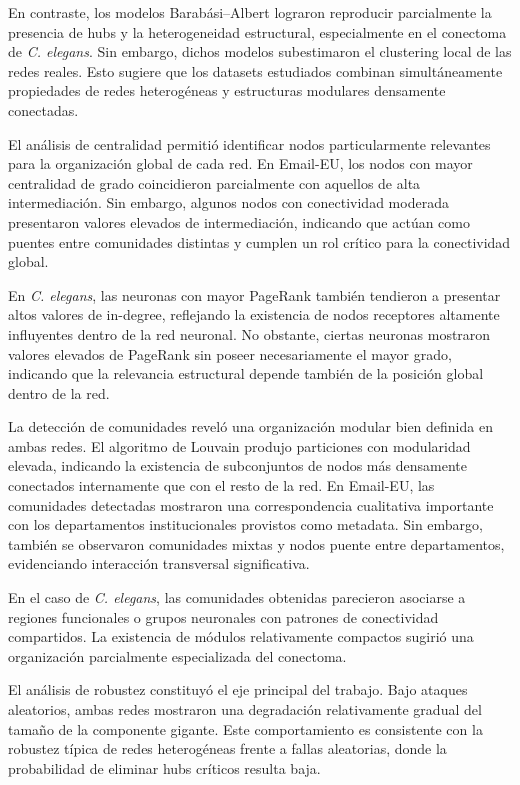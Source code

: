 En contraste, los modelos Barabási--Albert lograron reproducir parcialmente la presencia de hubs y la heterogeneidad estructural, especialmente en el conectoma de \textit{C. elegans}. Sin embargo, dichos modelos subestimaron el clustering local de las redes reales. Esto sugiere que los datasets estudiados combinan simultáneamente propiedades de redes heterogéneas y estructuras modulares densamente conectadas.

El análisis de centralidad permitió identificar nodos particularmente relevantes para la organización global de cada red. En Email-EU, los nodos con mayor centralidad de grado coincidieron parcialmente con aquellos de alta intermediación. Sin embargo, algunos nodos con conectividad moderada presentaron valores elevados de intermediación, indicando que actúan como puentes entre comunidades distintas y cumplen un rol crítico para la conectividad global.

En \textit{C. elegans}, las neuronas con mayor PageRank también tendieron a presentar altos valores de in-degree, reflejando la existencia de nodos receptores altamente influyentes dentro de la red neuronal. No obstante, ciertas neuronas mostraron valores elevados de PageRank sin poseer necesariamente el mayor grado, indicando que la relevancia estructural depende también de la posición global dentro de la red.

La detección de comunidades reveló una organización modular bien definida en ambas redes. El algoritmo de Louvain produjo particiones con modularidad elevada, indicando la existencia de subconjuntos de nodos más densamente conectados internamente que con el resto de la red. En Email-EU, las comunidades detectadas mostraron una correspondencia cualitativa importante con los departamentos institucionales provistos como metadata. Sin embargo, también se observaron comunidades mixtas y nodos puente entre departamentos, evidenciando interacción transversal significativa.

En el caso de \textit{C. elegans}, las comunidades obtenidas parecieron asociarse a regiones funcionales o grupos neuronales con patrones de conectividad compartidos. La existencia de módulos relativamente compactos sugirió una organización parcialmente especializada del conectoma.

El análisis de robustez constituyó el eje principal del trabajo. Bajo ataques aleatorios, ambas redes mostraron una degradación relativamente gradual del tamaño de la componente gigante. Este comportamiento es consistente con la robustez típica de redes heterogéneas frente a fallas aleatorias, donde la probabilidad de eliminar hubs críticos resulta baja.

